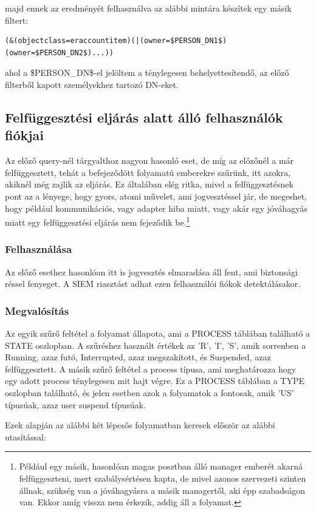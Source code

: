 		majd ennek az eredményét felhasználva az alábbi mintára készítek egy másik filtert:
		\begin{lstlisting}
(&(objectclass=eraccountitem)(|(owner=$PERSON_DN1$)(owner=$PERSON_DN2$)...))\end{lstlisting} \label{code:accownerfilter}
		ahol a \$PERSON\_DN\$-el jelöltem a ténylegesen behelyettesítendő, az előző filterből kapott személyekhez tartozó DN-eket.
		
\subsection{Felfüggesztési eljárás alatt álló felhasználók fiókjai}
Az előző query-nél tárgyalthoz nagyon hasonló eset, de míg az előzőnél a már felfüggesztett, tehát a befejeződött folyamatú emberekre szűrünk, itt azokra, akiknél még zajlik az eljárás. Ez általában elég ritka, mivel a felfüggesztésnek pont az a lényege, hogy gyors, atomi művelet, ami jogvesztéssel jár, de megeshet, hogy például kommunikációs, vagy adapter hiba miatt, vagy akár egy jóváhagyás miatt egy felfüggesztési eljárás nem fejeződik be.\footnote{Például egy másik, hasonlóan magas posztban álló manager emberét akarná felfüggeszteni, mert szabálysértésen kapta, de mivel azonos szervezeti szinten állnak, szükség van a jóváhagyásra a másik managertől, aki épp szabadságon van. Ekkor amíg vissza nem érkezik, addig áll a folyamat.}
	\subsubsection{Felhasználása}
		Az előző esethez hasonlóan itt is jogvesztés elmaradása áll fent, ami biztonsági réssel fenyeget. A SIEM riasztást adhat ezen felhasználói fiókok detektálásakor. 
	\subsubsection{Megvalósítás}
		Az egyik szűrő feltétel a folyamat állapota, ami a PROCESS táblában található a STATE oszlopban. A szűréshez használt értékek az 'R', 'I', 'S', amik sorrenben a Running, azaz futó, Interrupted, azaz megszakított, és Suspended, azaz felfüggesztett. A másik szűrő feltétel a process típusa, ami meghatározza hogy egy adott process ténylegesen mit hajt végre. Ez a PROCESS táblában a TYPE oszlopban található, és jelen esetben azok a folyamatok a fontosak, amik 'US' típusúak, azaz user suspend típusúak.
		
		Ezek alapján az alábbi két lépcsős folyamatban keresek először az alábbi utasítással:
		
